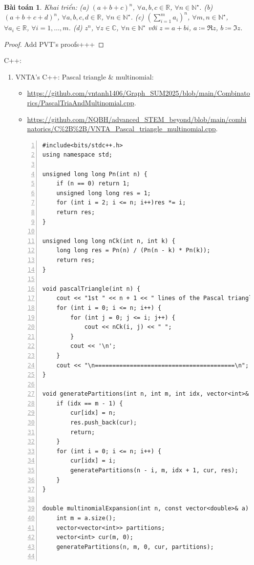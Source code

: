 \documentclass[oneside]{book}
\newtheorem{baitoan}{Bài toán}
\begin{document}
\begin{baitoan}
	Khai triển: (a) $(a + b + c)^n$, $\forall a,b,c\in\mathbb{R}$, $\forall n\in\mathbb{N}^\star$. (b) $(a + b + c + d)^n$, $\forall a,b,c,d\in\mathbb{R}$, $\forall n\in\mathbb{N}^\star$. (c) $\left(\sum_{i=1}^m a_i\right)^n$, $\forall m,n\in\mathbb{N}^\star$, $\forall a_i\in\mathbb{R}$, $\forall i = 1,\ldots,m$. (d) $z^n$, $\forall z\in\mathbb{C}$, $\forall n\in\mathbb{N}^\star$ với $z = a + bi$, $a\coloneqq\Re z$, $b\coloneqq\Im z$.
\end{baitoan}

\begin{proof}
	Add PVT's proofs+++
\end{proof}
C++:
\begin{enumerate}
	\item VNTA's C++: Pascal triangle \& multinomial:
	\begin{itemize}
		\item \url{https://github.com/vntanh1406/Graph_SUM2025/blob/main/Combinatorics/PascalTriaAndMultinomial.cpp}.
		\item \url{https://github.com/NQBH/advanced_STEM_beyond/blob/main/combinatorics/C%2B%2B/VNTA_Pascal_triangle_multinomial.cpp}.
	\end{itemize}
	\begin{Verbatim}[numbers=left,xleftmargin=5mm]
#include<bits/stdc++.h>
using namespace std;

unsigned long long Pn(int n) {
    if (n == 0) return 1;
    unsigned long long res = 1;
    for (int i = 2; i <= n; i++)res *= i;
    return res;
}

unsigned long long nCk(int n, int k) {
    long long res = Pn(n) / (Pn(n - k) * Pn(k));
    return res;
}

void pascalTriangle(int n) {
    cout << "1st " << n + 1 << " lines of the Pascal triangle: \n";
    for (int i = 0; i <= n; i++) {
        for (int j = 0; j <= i; j++) {
            cout << nCk(i, j) << " ";
        }
        cout << '\n';
    }
    cout << "\n========================================\n";
}

void generatePartitions(int n, int m, int idx, vector<int>& cur, vector<vector<int>>& res) {
    if (idx == m - 1) {
        cur[idx] = n;
        res.push_back(cur);
        return;
    }
    for (int i = 0; i <= n; i++) {
        cur[idx] = i;
        generatePartitions(n - i, m, idx + 1, cur, res);
    }
}

double multinomialExpansion(int n, const vector<double>& a) {
    int m = a.size();
    vector<vector<int>> partitions;
    vector<int> cur(m, 0);
    generatePartitions(n, m, 0, cur, partitions);
	

\end{Verbatim}
\end{enumerate}
\end{document}
